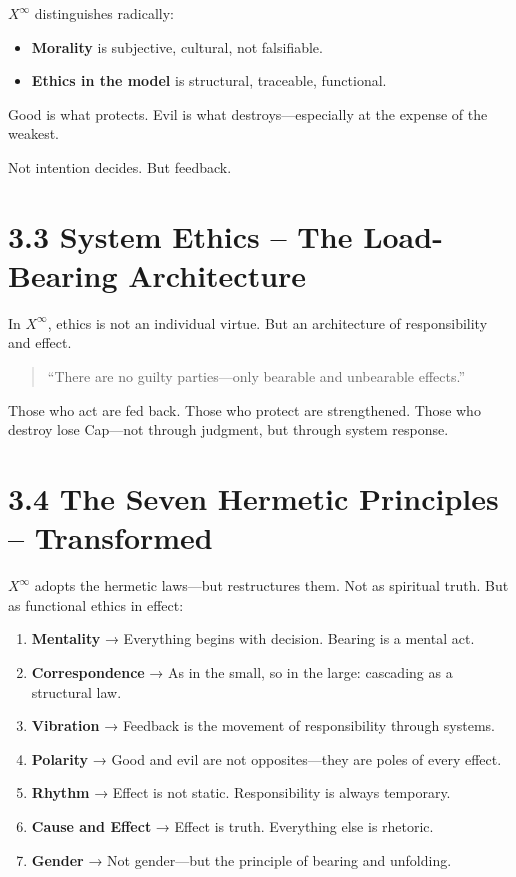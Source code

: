 \documentclass[12pt,a4paper]{book}
\begin{document}
$X^\infty$ distinguishes radically:

\begin{itemize}
    \item \textbf{Morality} is subjective, cultural, not falsifiable.
    \item \textbf{Ethics in the model} is structural, traceable, functional.
\end{itemize}

Good is what protects.  
Evil is what destroys—especially at the expense of the weakest.

Not intention decides.  
But feedback.

\section*{3.3 System Ethics – The Load-Bearing Architecture}

In $X^\infty$, ethics is not an individual virtue.  
But an architecture of responsibility and effect.

\begin{quote}
“There are no guilty parties—only bearable and unbearable effects.”
\end{quote}

Those who act are fed back. Those who protect are strengthened.  
Those who destroy lose Cap—not through judgment, but through system response.

\section*{3.4 The Seven Hermetic Principles – Transformed}

$X^\infty$ adopts the hermetic laws—but restructures them.  
Not as spiritual truth. But as functional ethics in effect:

\begin{enumerate}
    \item \textbf{Mentality} → Everything begins with decision. Bearing is a mental act.
    \item \textbf{Correspondence} → As in the small, so in the large: cascading as a structural law.
    \item \textbf{Vibration} → Feedback is the movement of responsibility through systems.
    \item \textbf{Polarity} → Good and evil are not opposites—they are poles of every effect.
    \item \textbf{Rhythm} → Effect is not static. Responsibility is always temporary.
    \item \textbf{Cause and Effect} → Effect is truth. Everything else is rhetoric.
    \item \textbf{Gender} → Not gender—but the principle of bearing and unfolding.
\end{enumerate}
\end{document}
